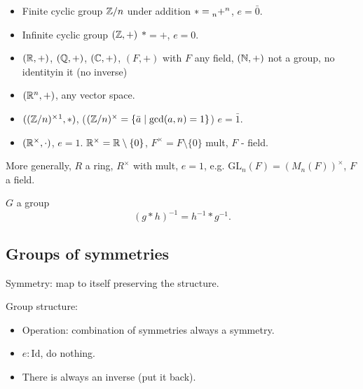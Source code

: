 \documentclass[10pt, a4paper]{article}
\begin{document}
\begin{example}
    \begin{itemize}
        \item Finite cyclic group $\mathbb{Z} / n$ under addition $* = \prescript{}{n}{+}^n$,
        $e = \bar{0}$.

        \item Infinite cyclic group $(\mathbb{Z}, +)$ $* = +$,
        $e = 0$.

        \item $(\mathbb{R}, +)$,
        $(\mathbb{Q}, +)$,
        $(\mathbb{C}, +)$,
        $(F, +)$ with $F$ any field,
        $(\mathbb{N}, +)$ not a group,
        no identity\footnotemark in it
        (no inverse)


        \item $(\mathbb{R} ^ n, +)$,
        any vector space.

        \item $((\Z / n ) ^ {\times}\footnotemark, *)$,
        ($(\mathbb{Z} / n) ^ {\times} = \{\bar{a} \mid \gcd(a, n) = 1\}$)
        $e = \bar{1}$.

        \item $(\mathbb{R} ^ {\times}, \cdot)$,
        $e = 1$.
        $\mathbb{R} ^ {\times} = \mathbb{R} \setminus \{0\}$,
        $F ^ {\times} = F \setminus \{0\}$ mult,
        $F$ -
        field.
    \end{itemize}
\end{example}

More generally,
$R$ a ring,
$R ^ {\times}$ with mult,
$e = 1$,
e.g. $\mathrm{GL}_n(F) = (M_n(F)) ^ {\times}$,
$F$ a field.

\begin{example}
    $G$ a group
    \[
    (g * h) ^ {-1}  = h ^ {-1} * g ^ {-1}.
    \]
\end{example}

\subsection{Groups of symmetries}
Symmetry:
map to itself preserving the structure.

Group structure:
\begin{itemize}
    \item Operation:
    combination of symmetries always a symmetry.
    \item $e : \mathrm{Id}$,
    do nothing.
    
    \item There is always an inverse
    (put it back).
\end{itemize}
\end{document}
